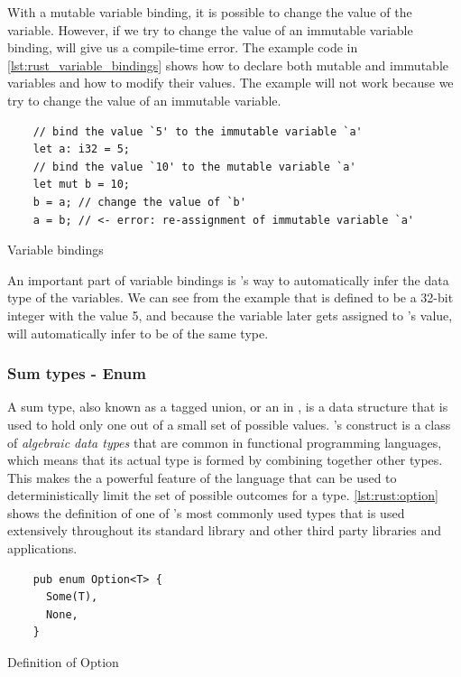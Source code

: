 With a mutable variable binding, it is possible to change the value of the variable.
However, if we try to change the value of an immutable variable binding, \rust will give us a compile-time error.
The example code in \autoref{lst:rust_variable_bindings} shows how to declare both mutable and immutable variables and how to modify their values.
The example will not work because we try to change the value of an immutable variable.

\begin{listing}[H]
  \begin{verbatim}
    // bind the value `5' to the immutable variable `a'
    let a: i32 = 5;
    // bind the value `10' to the mutable variable `a'
    let mut b = 10;
    b = a; // change the value of `b'
    a = b; // <- error: re-assignment of immutable variable `a'
  \end{verbatim}
  \caption{Variable bindings}
  \label{lst:rust_variable_bindings}
\end{listing}

An important part of variable bindings is \rust's way to automatically infer the data type of the variables.
We can see from the example that  is defined to be a 32-bit integer with the value 5, and because the variable  later gets assigned to 's value, \rust will automatically infer  to be of the same type.

\subsubsection{Sum types - Enum}

A sum type, also known as a tagged union, or an \enum in \rust, is a data structure that is used to hold only one out of a small set of possible values.
\rust's \enum construct is a class of \emph{algebraic data types} that are common in functional programming languages, which means that its actual type is formed by combining together other types.
This makes the \enum a powerful feature of the language that can be used to deterministically limit the set of possible outcomes for a type.
\autoref{lst:rust:option} shows the definition of one of \rust's most commonly used types that is used extensively throughout its standard library and other third party libraries and applications.

\begin{listing}[H]
  \begin{verbatim}
    pub enum Option<T> {
      Some(T),
      None,
    }
  \end{verbatim}
  \caption{Definition of Option}
  \label{lst:rust:option}
\end{listing}

